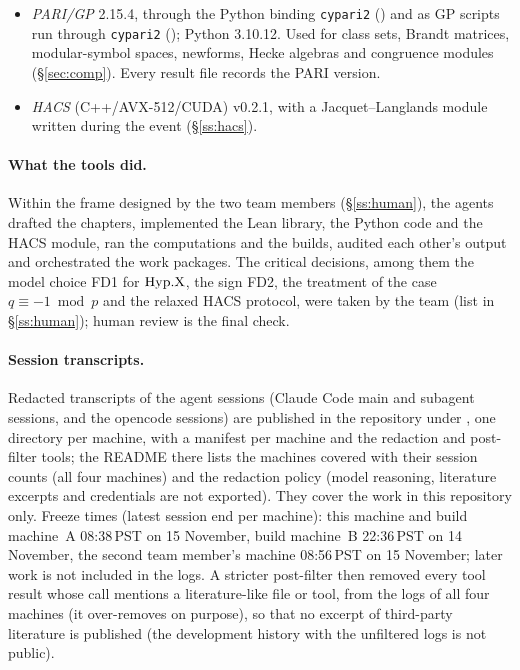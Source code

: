\begin{itemize}
  opencode is Q\&A-only); it was integrated into the library, independently audited (PASS WITH REMARKS) and gated from scratch
  by the agents. Likewise, the discharge of  was drafted by an external model (mistral-large-4-0 via opencode) on the second team member's machine, outside our agent process; integrated into the library, independently audited (Fable, PASS) and gated by our agents.
\item \emph{PARI/GP} 2.15.4, through the Python binding \texttt{cypari2} () and as
  GP scripts run through \texttt{cypari2} (); Python 3.10.12. Used for class sets, Brandt
  matrices, modular-symbol spaces, newforms, Hecke algebras and congruence modules (\S\ref{sec:comp}). Every result file records
  the PARI version.
\item \emph{HACS} (C++/AVX-512/CUDA) v0.2.1, with a Jacquet--Langlands module written during the event (\S\ref{ss:hacs}).
\end{itemize}

\paragraph{What the tools did.} Within the frame designed by the two team members (\S\ref{ss:human}), the agents drafted the
chapters, implemented the Lean library, the Python code and the HACS module, ran the computations and the builds, audited
each other's output and orchestrated the work packages. The critical decisions, among them the model choice FD1 for
$\mathrm{Hyp.X}$, the sign FD2, the treatment of the case $q\equiv-1\bmod p$ and the relaxed HACS protocol, were taken by the team
(list in \S\ref{ss:human}); human review is the final check.

\paragraph{Session transcripts.} Redacted transcripts of the agent sessions (Claude Code main and subagent sessions, and the
opencode sessions) are published in the repository under , one directory per machine, with a
manifest per machine and the redaction and post-filter tools; the README there lists the machines covered with their session counts (all four machines) and the redaction policy
(model reasoning, literature excerpts and credentials are not exported). They cover the work in this repository only. Freeze times (latest session end per machine): this machine and build machine~A 08:38\,PST on 15 November, build machine~B 22:36\,PST on 14 November, the second team member's machine 08:56\,PST on 15 November; later work is not included in the logs. A stricter post-filter then removed every tool result whose call mentions a literature-like file or tool, from the logs of all four machines (it over-removes on purpose), so that no excerpt of third-party literature is published (the development history with the unfiltered logs is not public).

